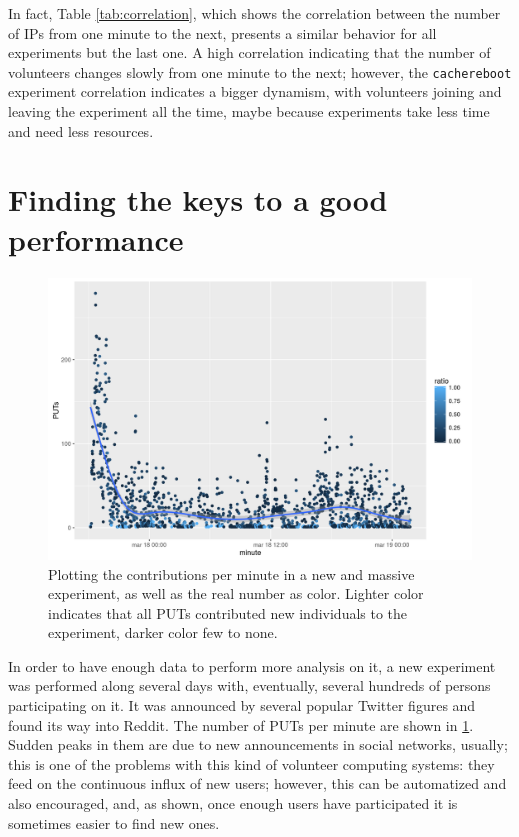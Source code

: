 \documentclass[runningheads,a4paper]{llncs}\usepackage[]{graphicx}\usepackage[]{color}
\makeatletter
\def\maxwidth{ %
  \ifdim\Gin@nat@width>\linewidth
    \linewidth
  \else
    \Gin@nat@width
  \fi
}
\newenvironment{knitrout}{}{} %
\makeatother
\begin{document}
In fact, Table \ref{tab:correlation}, which shows
the correlation between the number of IPs from one minute to the
next, presents a similar  behavior for all experiments but the last one. A high correlation indicating that the number of volunteers changes
slowly from one minute to the next; however, the {\tt cachereboot} experiment correlation indicates a bigger
dynamism, with volunteers joining and leaving the experiment all the
time, maybe because experiments take less time and need less resources.

\section{Finding the keys to a good performance}
%
%
\begin{figure}[ht!b]
\centering
\begin{knitrout}
\color{fgcolor}
\includegraphics[width=\maxwidth]{figure/minutedata-1} 

\end{knitrout}
%
\caption{Plotting the contributions per minute in a new and massive
  experiment, as well as the real number as color. Lighter color
  indicates that all PUTs contributed new individuals to the
  experiment, darker color few to none. \label{fig:minute}}
\end{figure}

In order to have enough data to perform more analysis on it, a new
experiment was performed along several days with, eventually, several
hundreds of persons participating on it. It was announced by several
popular Twitter figures and found its way into Reddit. The number of
PUTs per minute are shown in \ref{fig:minute}. Sudden peaks in them
are due to new announcements in social networks, usually; this is one
of the problems with this kind of volunteer computing systems: they
feed on the continuous influx of new users; however, this can be
automatized and also encouraged, and, as shown, once enough users have
participated it is sometimes easier to find new ones. 
\end{document}

